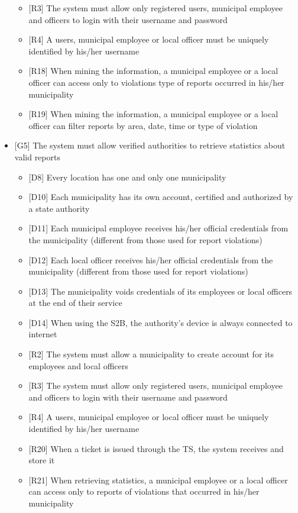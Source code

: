 \begin{itemize}
\begin{itemize}
								\item {[R3]} The system must allow only registered users, municipal employee and officers to login with their username and password
								\item {[R4]} A users, municipal employee or local officer must be uniquely identified by his/her username
								\item {[R18]} When mining the information, a municipal employee or a local officer can access only to violations type of reports occurred in his/her municipality
								\item {[R19]} When mining the information, a municipal employee or a local officer can filter reports by area, date, time or type of violation
							\end{itemize}
						\item {[G5]} The system must allow verified authorities to retrieve statistics about valid reports
							\begin{itemize}
								\item {[D8]} Every location has one and only one municipality
								\item {[D10]} Each municipality has its own account, certified and authorized by a state authority
								\item {[D11]} Each municipal employee receives his/her official credentials from the municipality (different from those used for report violations)
								\item {[D12]} Each local officer receives his/her official credentials from the municipality (different from those used for report violations)
								\item {[D13]} The municipality voids credentials of its employees or local officers at the end of their service
								\item {[D14]} When using the S2B, the authority's device is always connected to internet
								\item {[R2]} The system must allow a municipality to create account for its employees and local officers
								\item {[R3]} The system must allow only registered users, municipal employee and officers to login with their username and password
								\item {[R4]} A users, municipal employee or local officer must be uniquely identified by his/her username 
								\item {[R20]} When a ticket is issued through the TS, the system receives and store it
								\item {[R21]} When retrieving statistics, a municipal employee or a local officer can access only to reports of violations that occurred in his/her municipality

\end{itemize}
\end{itemize}
